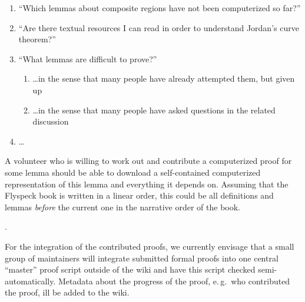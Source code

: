 \begin{enumerate}
\item\label{item:proven-lemma} ``Which lemmas about composite regions have not been
  computerized so far?''
\item ``Are there textual resources I can read in order to understand Jordan's curve
  theorem?''
\item ``What lemmas are difficult to prove?''
  \begin{enumerate}
  \item \ldots in the sense that many people have already attempted them, but given up
  \item\label{item:question-count} \ldots in the sense that many people have asked
    questions in the related discussion
  \end{enumerate}
\item \ldots{}
\end{enumerate}

A volunteer who is willing to work out and contribute a computerized
proof for some lemma should be able to download a self-contained
computerized representation of this lemma and everything it depends
on.  Assuming that the Flyspeck book is written in a linear order, this could be all
definitions and lemmas \emph{before} the current one in the narrative order of the
book.  

.

For the integration of the contributed proofs, we currently envisage
that a small group of maintainers will integrate submitted formal
proofs into one central ``master'' proof script outside of the wiki
and have this script checked semi-automatically.  Metadata about the
progress of the proof, e.\,g.\ who contributed the proof, ill be added
to the wiki.  


